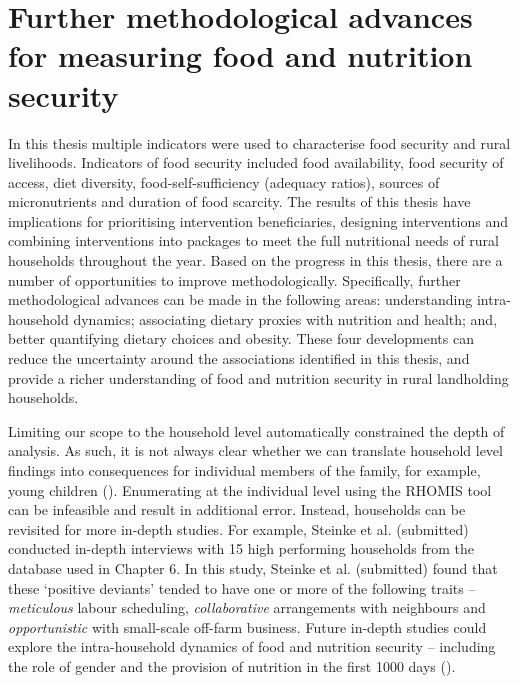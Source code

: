 \section{Further methodological advances for measuring food and nutrition security}
In this thesis multiple indicators were used to characterise food security and rural livelihoods. Indicators of food security included food availability, food security of access, diet diversity, food-self-sufficiency (adequacy ratios), sources of micronutrients and duration of food scarcity. The results of this thesis have implications for prioritising intervention beneficiaries, designing interventions and combining interventions into packages to meet the full nutritional needs of rural households throughout the year. Based on the progress in this thesis, there are a number of opportunities to improve methodologically. Specifically, further methodological advances can be made in the following areas: understanding intra-household dynamics; associating dietary proxies with nutrition and health; and, better quantifying dietary choices and obesity. These four developments can reduce the uncertainty around the associations identified in this thesis, and provide a richer understanding of food and nutrition security in rural landholding households.

Limiting our scope to the household level automatically constrained the depth of analysis. As such, it is not always clear whether we can translate household level findings into consequences for individual members of the family, for example, young children (\citealp{Caraher2016}). Enumerating at the individual level using the RHOMIS tool can be infeasible and result in additional error. Instead, households can be revisited for more in-depth studies. For example, Steinke et al. (submitted) conducted in-depth interviews with 15 high performing households from the database used in Chapter 6. In this study, Steinke et al. (submitted) found that these `positive deviants' tended to have one or more of the following traits -- \textit{meticulous} labour scheduling, \textit{collaborative} arrangements with neighbours and \textit{opportunistic} with small-scale off-farm business. Future in-depth studies could explore the intra-household dynamics of food and nutrition security -- including the role of gender and the provision of nutrition in the first 1000 days (\citealp{Sharma2017, DePee2017}).

